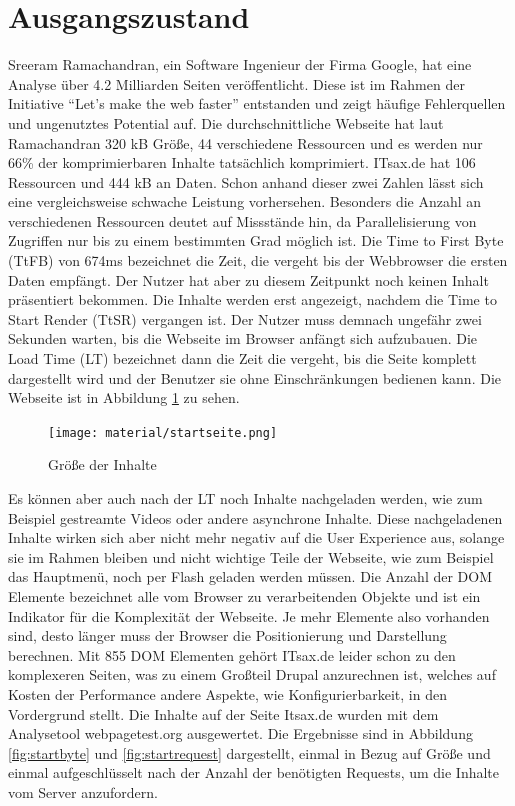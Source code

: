 \section{Ausgangszustand}  
Sreeram Ramachandran, ein Software Ingenieur der Firma Google, hat eine Analyse über 4.2 Milliarden Seiten veröffentlicht. Diese ist im Rahmen der Initiative "`Let's make the web faster"' entstanden und zeigt häufige Fehlerquellen und ungenutztes Potential auf. Die durchschnittliche Webseite hat laut Ramachandran 320 kB Größe, 44 verschiedene Ressourcen und es werden nur 66\% der komprimierbaren Inhalte tatsächlich komprimiert.\citep{Google2011a}
ITsax.de hat 106 Ressourcen und 444 kB an Daten. Schon anhand dieser zwei Zahlen lässt sich eine vergleichsweise schwache Leistung vorhersehen. Besonders die Anzahl an verschiedenen Ressourcen deutet auf Missstände hin, da Parallelisierung von Zugriffen nur bis zu einem bestimmten Grad möglich ist. Die Time to First Byte (TtFB) von 674ms bezeichnet die Zeit, die vergeht bis der Webbrowser die ersten Daten empfängt. Der Nutzer hat aber zu diesem Zeitpunkt noch keinen Inhalt pr\"asentiert bekommen. Die Inhalte werden erst angezeigt, nachdem die Time to Start Render (TtSR) vergangen ist. Der Nutzer muss demnach ungefähr zwei Sekunden warten, bis die Webseite im Browser anfängt sich aufzubauen. Die Load Time (LT) bezeichnet dann die Zeit die vergeht, bis die Seite komplett dargestellt wird und der Benutzer sie ohne Einschränkungen bedienen kann.
Die Webseite ist in Abbildung \ref{fig:itsax} zu sehen. 
\begin{figure}[!ht]
  \centering
  \texttt{[image: material/startseite.png]}
  \caption{Größe der Inhalte}
  \label{fig:itsax}
\end{figure}
Es können aber auch nach der LT noch Inhalte nachgeladen werden, wie zum Beispiel gestreamte Videos oder andere asynchrone Inhalte. Diese nachgeladenen Inhalte wirken sich aber nicht mehr negativ auf die User Experience aus, solange sie im Rahmen bleiben und nicht wichtige Teile der Webseite, wie zum Beispiel das Hauptmenü, noch per Flash geladen werden müssen. Die Anzahl der DOM Elemente bezeichnet alle vom Browser zu verarbeitenden Objekte und ist ein Indikator für die Komplexität der Webseite. Je mehr Elemente also vorhanden sind, desto länger muss der Browser die Positionierung und Darstellung berechnen. Mit 855 DOM Elementen gehört ITsax.de leider schon zu den komplexeren Seiten, was zu einem Großteil Drupal anzurechnen ist, welches auf Kosten der Performance andere Aspekte, wie Konfigurierbarkeit, in den Vordergrund stellt. Die Inhalte auf der Seite Itsax.de wurden mit dem Analysetool webpagetest.org ausgewertet. Die Ergebnisse sind in Abbildung \ref{fig:startbyte} und \ref{fig:startrequest} dargestellt, einmal in Bezug auf Größe und einmal aufgeschlüsselt nach der Anzahl der benötigten Requests, um die Inhalte vom Server anzufordern. 
